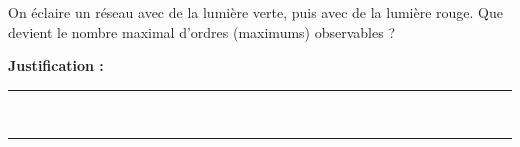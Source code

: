 On éclaire un réseau avec de la lumière verte, puis avec de la lumière rouge. Que devient le nombre maximal d'ordres (maximums) observables ?

\choices

\noindent\textbf{Justification :} \hrulefill \\[2.5ex]
\rule{\linewidth}{0.4pt} \\[2.5ex]
\rule{\linewidth}{0.4pt}
\vfill
